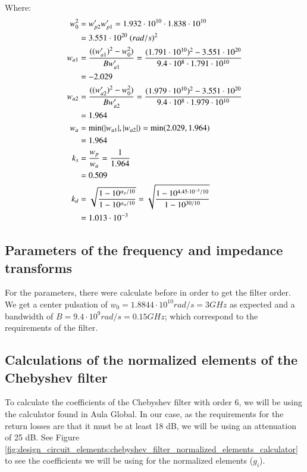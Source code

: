 \documentclass[12pt]{report} %
\begin{document}
Where:
\begin{align*}
w_0^2 &= w'_{p2} \* w'_{p1} = 1.932 \cdot 10^{10} \cdot 1.838 \cdot 10^{10} \\
&= 3.551 \cdot 10^{20} \ (rad/s)^2 \\
w_{a1} &= \frac{((w'_{a1})^2 - w_{0}^2)}{B \* w'_{a1}} = \frac{(1.791 \cdot 10^{10})^2 - 3.551 \cdot 10^{20}}{9.4 \cdot 10^8 \cdot 1.791 \cdot 10^{10}} \\
&= -2.029 \\
w_{a2} &= \frac{((w'_{a2})^2 - w_{0}^2)}{B \* w'_{a2}} = \frac{(1.979 \cdot 10^{10})^2 - 3.551 \cdot 10^{20}}{9.4 \cdot 10^8 \cdot 1.979 \cdot 10^{10}} \\
&= 1.964 \\
w_a &= \min (|w_{a1} |, |w_{a2}|) = \min (2.029, 1.964) \\
&= 1.964 \\
k_s &= \frac{w_p}{w_a} = \frac{1}{1.964} \\
&= 0.509 \\
k_d &= \sqrt{\frac{1 - 10^{\alpha_p / 10}}{1 - 10^{\alpha_a / 10}}} = \sqrt{\frac{1 - 10^{4.45 \cdot 10^{-3} / 10}}{1 - 10^{30 / 10}}} \\
&= 1.013 \cdot 10^{-3}
\end{align*}

\subsection{Parameters of the frequency and impedance transforms}

For the parameters, there were calculate before in order to get the filter order. We get a center pulsation of $w_0 = 1.8844 \cdot 10^{10} rad/s = 3 GHz$ as expected and a bandwidth of $B = 9.4 \cdot 10^{9} rad/s = 0.15 GHz$; which correspond to the requirements of the filter.

\subsection{Calculations of the normalized elements of the Chebyshev filter}

To calculate the coefficients of the Chebyshev filter with order 6, we will be using the calculator found in Aula Global. In our case, as the requirements for the return losses are that it must be at least 18 dB, we will be using an attenuation of 25 dB. See Figure \ref{fig:design_circuit_elements:chebyshev_filter_normalized_elements_calculator} to see the coefficients we will be using for the normalized elements ($g_i$). 
\end{document}

